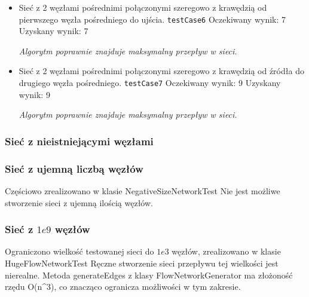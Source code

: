 \begin{itemize}[nosep]
    \item Sieć z 2 węzłami pośrednimi połączonymi szeregowo z krawędzią od
    pierwszego węzła pośredniego do ujścia.
    \texttt{testCase6}
    Oczekiwany wynik: 7
    Uzyskany wynik: 7

    \emph{Algorytm poprawnie znajduje maksymalny przepływ w sieci.}

    \item Sieć z 2 węzłami pośrednimi połączonymi szeregowo z krawędzią od
    źródła do drugiego węzła pośredniego.
    \texttt{testCase7}
    Oczekiwany wynik: 9
    Uzyskany wynik: 9

    \emph{Algorytm poprawnie znajduje maksymalny przepływ w sieci.}

\end{itemize}


\subsubsection{Sieć z nieistniejącymi węzłami}


\subsubsection{Sieć z ujemną liczbą węzłów}
Częściowo zrealizowano w klasie NegativeSizeNetworkTest Nie jest możliwe
stworzenie sieci z ujemną ilością węzłów.

\subsubsection{Sieć z $1e9$ węzłów}
Ograniczono wielkość testowanej sieci do $1e3$ węzłów, zrealizowano w klasie
HugeFlowNetworkTest Ręczne stworzenie sieci przepływu tej wielkości jest
nierealne. Metoda generateEdges z klasy FlowNetworkGenerator ma złożoność
rzędu O(n^3), co znacząco ogranicza możliwości w tym zakresie.

